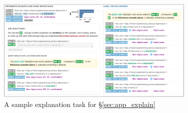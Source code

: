 \begin{figure}[ht]
\centering
\includegraphics[width=0.85\textwidth]{figures/explanation_task_ui}
\vspace{-5pt}
\caption{A sample explanation task for \S\ref{sec:app_explain}}
\vspace{-10pt}
\label{fig:explanation_ui}
\end{figure}

